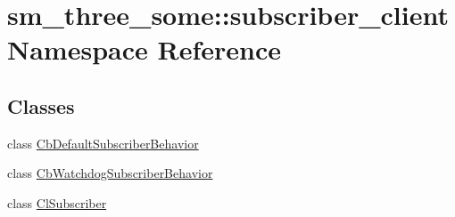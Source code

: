 \hypertarget{namespacesm__three__some_1_1subscriber__client}{}\section{sm\+\_\+three\+\_\+some\+:\+:subscriber\+\_\+client Namespace Reference}
\label{namespacesm__three__some_1_1subscriber__client}
\subsection*{Classes}
\begin{DoxyCompactItemize}
\item 
class \hyperlink{classsm__three__some_1_1subscriber__client_1_1CbDefaultSubscriberBehavior}{Cb\+Default\+Subscriber\+Behavior}
\item 
class \hyperlink{classsm__three__some_1_1subscriber__client_1_1CbWatchdogSubscriberBehavior}{Cb\+Watchdog\+Subscriber\+Behavior}
\item 
class \hyperlink{classsm__three__some_1_1subscriber__client_1_1ClSubscriber}{Cl\+Subscriber}
\end{DoxyCompactItemize}
